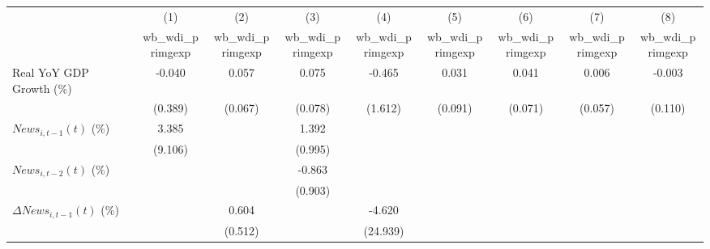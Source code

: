 {
\def\sym#1{\ifmmode^{#1}\else\(^{#1}\)\fi}
\begin{tabular}{l*{8}{c}}
\toprule
                    &\multicolumn{1}{c}{(1)}&\multicolumn{1}{c}{(2)}&\multicolumn{1}{c}{(3)}&\multicolumn{1}{c}{(4)}&\multicolumn{1}{c}{(5)}&\multicolumn{1}{c}{(6)}&\multicolumn{1}{c}{(7)}&\multicolumn{1}{c}{(8)}\\
                    &\multicolumn{1}{c}{wb_wdi_primgexp}&\multicolumn{1}{c}{wb_wdi_primgexp}&\multicolumn{1}{c}{wb_wdi_primgexp}&\multicolumn{1}{c}{wb_wdi_primgexp}&\multicolumn{1}{c}{wb_wdi_primgexp}&\multicolumn{1}{c}{wb_wdi_primgexp}&\multicolumn{1}{c}{wb_wdi_primgexp}&\multicolumn{1}{c}{wb_wdi_primgexp}\\
\midrule
Real YoY GDP Growth (\%)&      -0.040         &       0.057         &       0.075         &      -0.465         &       0.031         &       0.041         &       0.006         &      -0.003         \\
                    &     (0.389)         &     (0.067)         &     (0.078)         &     (1.612)         &     (0.091)         &     (0.071)         &     (0.057)         &     (0.110)         \\
\addlinespace
$ News_{i,t-1}(t)$ (\%)&       3.385         &                     &       1.392         &                     &                     &                     &                     &                     \\
                    &     (9.106)         &                     &     (0.995)         &                     &                     &                     &                     &                     \\
\addlinespace
$ News_{i,t-2}(t)$ (\%)&                     &                     &      -0.863         &                     &                     &                     &                     &                     \\
                    &                     &                     &     (0.903)         &                     &                     &                     &                     &                     \\
\addlinespace
$ \Delta News_{i,t-1}(t)$ (\%)&                     &       0.604         &                     &      -4.620         &                     &                     &                     &                     \\
                    &                     &     (0.512)         &                     &    (24.939)         &                     &                     &                     &                     \\

\end{tabular}}
